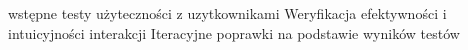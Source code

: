 wstępne testy użyteczności z uzytkownikami 
Weryfikacja efektywności i intuicyjności interakcji
Iteracyjne poprawki na podstawie wyników testów

